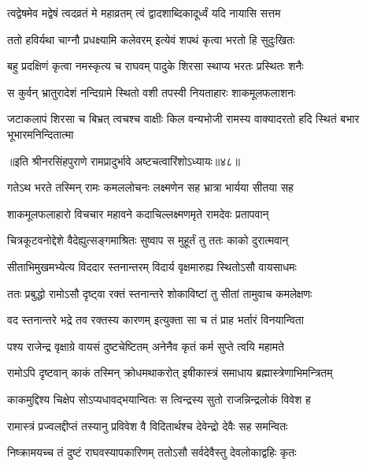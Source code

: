 \twolineshloka
{त्वद्वेषमेव मद्वेषं त्वदव्रतं मे महाव्रतम्}
{त्वं द्वादशाब्दिकादूर्ध्वं यदि नायासि सत्तम} %

\twolineshloka
{ततो हविर्यथा चाग्नौ प्रधक्ष्यामि कलेवरम्}
{इत्येवं शपथं कृत्वा भरतो हि सुदुःखितः} %

\twolineshloka
{बहु प्रदक्षिणं कृत्वा नमस्कृत्य च राघवम्}
{पादुके शिरसा स्थाप्य भरतः प्रस्थितः शनैः} %

\twolineshloka
{स कुर्वन् भ्रातुरादेशं नन्दिग्रामे स्थितो वशी}
{तपस्वी नियताहारः शाकमूलफलाशनः} %

\fourlineindentedshloka
{जटाकलापं शिरसा च बिभ्रत्}
{त्वचश्च वाक्षीः किल वन्यभोजी}
{रामस्य वाक्यादरतो हदि स्थितं}
{बभार भूभारमनिन्दितात्मा} %

॥इति श्रीनरसिंहपुराणे रामप्रादुर्भावे अष्टचत्वारिंशोऽध्यायः॥४८॥



\twolineshloka
{गतेऽथ भरते तस्मिन् रामः कमललोचनः}
{लक्ष्मणेन सह भ्रात्रा भार्यया सीतया सह} %

\twolineshloka
{शाकमूलफलाहारो विचचार महावने}
{कदाचिल्लक्ष्मणमृते रामदेवः प्रतापवान्} %

\twolineshloka
{चित्रकूटवनोद्देशे वैदेह्युत्सङ्गमाश्रितः}
{सुष्वाप स मुहूर्तं तु ततः काको दुरात्मवान्} %

\twolineshloka
{सीताभिमुखमभ्येत्य विददार स्तनान्तरम्}
{विदार्य वृक्षमारुह्य स्थितोऽसौ वायसाधमः} %

\twolineshloka
{ततः प्रबुद्धो रामोऽसौ दृष्ट्वा रक्तं स्तनान्तरे}
{शोकाविष्टां तु सीतां तामुवाच कमलेक्षणः} %

\twolineshloka
{वद स्तनान्तरे भद्रे तव रक्तस्य कारणम्}
{इत्युक्ता सा च तं प्राह भर्तारं विनयान्विता} %

\twolineshloka
{पश्य राजेन्द्र वृक्षाग्रे वायसं दुष्टचेष्टितम्}
{अनेनैव कृतं कर्म सुप्ते त्वयि महामते} %

\twolineshloka
{रामोऽपि दृष्टवान् काकं तस्मिन् क्रोधमथाकरोत्}
{इषीकास्त्रं समाधाय ब्रह्मास्त्रेणाभिमन्त्रितम्} %

\twolineshloka
{काकमुद्दिश्य चिक्षेप सोऽप्यधावद्भयान्वितः}
{स त्विन्द्रस्य सुतो राजन्निन्द्रलोकं विवेश ह} %

\twolineshloka
{रामास्त्रं प्रज्वलद्दीप्तं तस्यानु प्रविवेश वै}
{विदितार्थश्च देवेन्द्रो देवैः सह समन्वितः} %

\twolineshloka
{निष्क्रामयच्च तं दुष्टं राघवस्यापकारिणम्}
{ततोऽसौ सर्वदेवैस्तु देवलोकाद्वहिः कृतः} %

